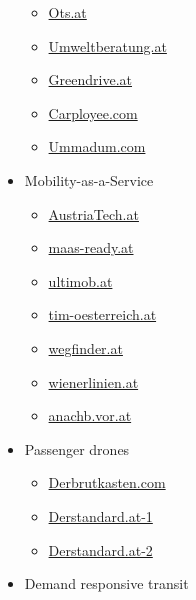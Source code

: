 \documentclass[
]{book}
\providecommand{\tightlist}{%
  \setlength{\itemsep}{0pt}\setlength{\parskip}{0pt}}
\begin{document}
\begin{itemize}
  \begin{itemize}
  \tightlist
  \item
    \href{https://www.ots.at/presseaussendung/OTS_20210113_OTS0026/free-now-will-als-erste-mobilitaetsplattform-in-europa-bis-2030-null-emissionen-erreichen}{Ots.at}
  \item
    \href{https://www.umweltberatung.at/carsharing-mitfahrboersen}{Umweltberatung.at}
  \item
    \href{https://greendrive.at/premium/\#benefits}{Greendrive.at}
  \item
    \href{https://www.carployee.com/\#start-section}{Carployee.com}
  \item
    \href{https://ummadum.com/}{Ummadum.com}
  \end{itemize}
\item
  Mobility-as-a-Service

  \begin{itemize}
  \tightlist
  \item
    \href{https://www.austriatech.at/assets/Uploads/Publikationen/PDF-Dateien/29fc02ada2/MaaS-miA_english_102019_web.pdf}{AustriaTech.at}
  \item
    \href{https://maas-ready.at}{maas-ready.at}
  \item
    \href{https://www.ultimob.at}{ultimob.at}
  \item
    \href{https://www.tim-oesterreich.at/graz/}{tim-oesterreich.at}
  \item
    \href{https://wegfinder.at/}{wegfinder.at}
  \item
    \href{https://www.wienerlinien.at/eportal3/ep/channelView.do/pageTypeId/66526/channelId/-3600060}{wienerlinien.at}
  \item
    \href{https://anachb.vor.at/}{anachb.vor.at}
  \end{itemize}
\item
  Passenger drones

  \begin{itemize}
  \tightlist
  \item
    \href{https://brutkasten.com/autonome-lufttaxis-linz-ag-facc-ehang/}{Derbrutkasten.com}
  \item
    \href{https://www.derstandard.at/consent/tcf/story/2000103120464/erste-teststrecke-fuer-e-lufttaxis-2020-in-linz}{Derstandard.at-1}
  \item
    \href{https://www.derstandard.at/consent/tcf/story/2000122402408/flugtaxis-wann-kommt-der-tesla-der-luefte}{Derstandard.at-2}
  \end{itemize}
\item
  Demand responsive transit


\end{itemize}
\end{document}
